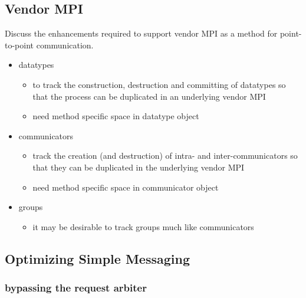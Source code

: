 
\subsection{Vendor MPI}

Discuss the enhancements required to support vendor MPI as a method for
point-to-point communication.
\begin{itemize}
\item datatypes
  \begin{itemize}
  \item to track the construction, destruction and committing of datatypes so
    that the process can be duplicated in an underlying vendor MPI
  \item need method specific space in datatype object 
  \end{itemize}
\item communicators
  \begin{itemize}
  \item track the creation (and destruction) of intra- and inter-communicators
    so that they can be duplicated in the underlying vendor MPI
  \item need method specific space in communicator object 
  \end{itemize}
\item groups
  \begin{itemize}
  \item it may be desirable to track groups much like communicators
  \end{itemize}
\end{itemize}


\subsection{Optimizing Simple Messaging}


\subsubsection{bypassing the request arbiter}

